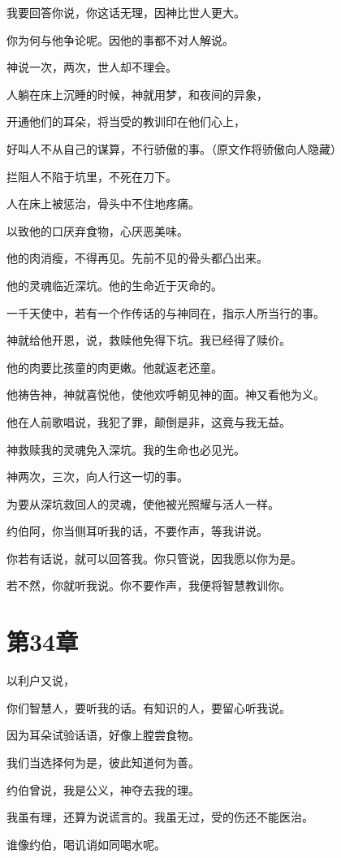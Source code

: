 \documentclass[12pt,oneside]{book}
\begin{document}
我要回答你说，你这话无理，因神比世人更大。

你为何与他争论呢。因他的事都不对人解说。

神说一次，两次，世人却不理会。

人躺在床上沉睡的时候，神就用梦，和夜间的异象，

开通他们的耳朵，将当受的教训印在他们心上，

好叫人不从自己的谋算，不行骄傲的事。（原文作将骄傲向人隐藏）

拦阻人不陷于坑里，不死在刀下。

人在床上被惩治，骨头中不住地疼痛。

以致他的口厌弃食物，心厌恶美味。

他的肉消瘦，不得再见。先前不见的骨头都凸出来。

他的灵魂临近深坑。他的生命近于灭命的。

一千天使中，若有一个作传话的与神同在，指示人所当行的事。

神就给他开恩，说，救赎他免得下坑。我已经得了赎价。

他的肉要比孩童的肉更嫩。他就返老还童。

他祷告神，神就喜悦他，使他欢呼朝见神的面。神又看他为义。

他在人前歌唱说，我犯了罪，颠倒是非，这竟与我无益。

神救赎我的灵魂免入深坑。我的生命也必见光。

神两次，三次，向人行这一切的事。

为要从深坑救回人的灵魂，使他被光照耀与活人一样。

约伯阿，你当侧耳听我的话，不要作声，等我讲说。

你若有话说，就可以回答我。你只管说，因我愿以你为是。

若不然，你就听我说。你不要作声，我便将智慧教训你。


\chapter{第34章}
以利户又说，

你们智慧人，要听我的话。有知识的人，要留心听我说。

因为耳朵试验话语，好像上膛尝食物。

我们当选择何为是，彼此知道何为善。

约伯曾说，我是公义，神夺去我的理。

我虽有理，还算为说谎言的。我虽无过，受的伤还不能医治。

谁像约伯，喝讥诮如同喝水呢。
\end{document}
